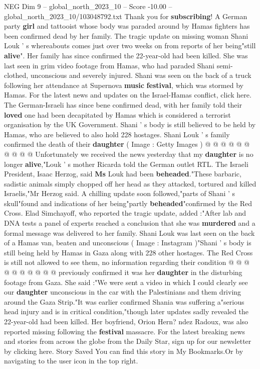 \begin{textsample}{NEG Dim 9 – global\_north\_2023\_10 – Score -10.00 – global\_north\_2023\_10/103048792.txt}  \label{ex:f9_neg_031}
Thank you for \textbf{subscribing}!
A German party \textbf{girl} and tattooist whose body was paraded around by Hamas fighters has been confirmed dead by her family.
The tragic update on missing woman Shani Louk ' s whereabouts comes just over two weeks on from reports of her being"still \textbf{alive}".
Her family has since confirmed the 22-year-old had been killed.
She was last seen in grim video footage from Hamas, who had paraded Shani semi-clothed, unconscious and severely injured.
Shani was seen on the back of a truck following her attendance at Supernova \textbf{music} \textbf{festival}, which was stormed by Hamas.
For the latest news and updates on the Israel-Hamas conflict, click here.
The German-Israeli has since bene confirmed dead, with her family told their \textbf{loved} one had been decapitated by Hamas which is considered a terrorist organisation by the UK Government.
Shani ' s body is still believed to be held by Hamas, who are believed to also hold 228 hostages.
Shani Louk ' s family confirmed the death of their \textbf{daughter} ( Image : Getty Images ) @ @ @ @ @ @ @ @ @ @ Unfortunately we received the news yesterday that my \textbf{daughter} is no longer \textbf{alive},"Louk ' s mother Ricarda told the German outlet RTL.
The Israeli President, Isaac Herzog, said \textbf{Ms} Louk had been \textbf{beheaded}."These barbaric, sadistic animals simply chopped off her head as they attacked, tortured and killed Israelis,"Mr Herzog said.
A chilling update soon followed,"parts of Shani ' s skull"found and indications of her being"partly \textbf{beheaded}"confirmed by the Red Cross.
Elad Simchayoff, who reported the tragic update, added :"After lab and DNA tests a panel of experts reached a conclusion that she was \textbf{murdered} and a formal message was delivered to her family.
Shani Louk was last seen on the back of a Hamas van, beaten and unconscious ( Image : Instagram )"Shani ' s body is still being held by Hamas in Gaza along with 228 other hostages.
The Red Cross is still not allowed to see them, no information regarding their condition @ @ @ @ @ @ @ @ @ @ previously confirmed it was her \textbf{daughter} in the disturbing footage from Gaza.
She said :"We were sent a video in which I could clearly see our \textbf{daughter} unconscious in the car with the Palestinians and them driving around the Gaza Strip."It was earlier confirmed Shania was suffering a"serious head injury and is in critical condition,"though later updates sadly revealed the 22-year-old had been killed.
Her boyfriend, Orion Hern? ndez Radoux, was also reported missing following the \textbf{festival} massacre.
For the latest breaking news and stories from across the globe from the Daily Star, sign up for our newsletter by clicking here.
Story Saved You can find this story in My Bookmarks.Or by navigating to the user icon in the top right.

\end{textsample}
